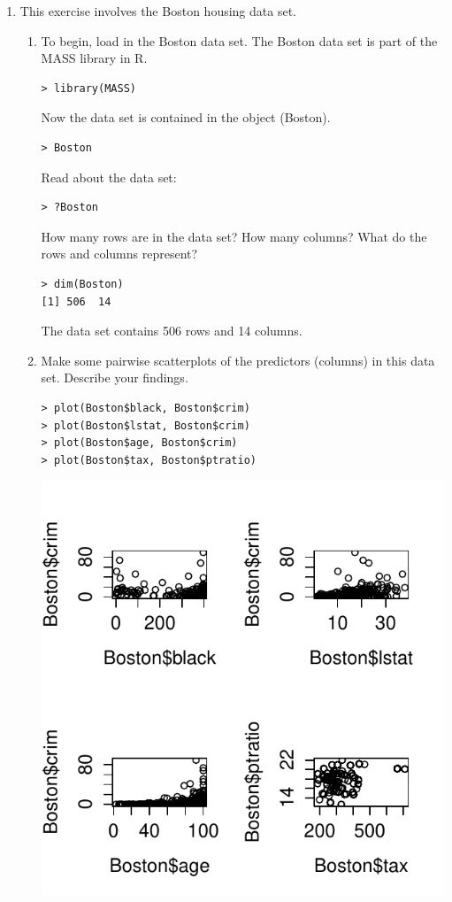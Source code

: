 \documentclass[11pt]{article}
\providecommand{\code}[1]{{\color{red}\ttfamily #1}}
\begin{document}
\begin{enumerate}
\item This exercise involves the \code{Boston} housing data set.
\begin{enumerate}
\item To begin, load in the \code{Boston} data set.  The \code{Boston} data set is part of the \code{MASS} library in \code{R}.
\begin{lstlisting}
> library(MASS)
\end{lstlisting}
Now the data set is contained in the object \code(Boston).
\begin{lstlisting}
> Boston
\end{lstlisting}
Read about the data set:
\begin{lstlisting}
> ?Boston
\end{lstlisting}
How many rows are in the data set? How many columns? What do the rows and columns represent?
\begin{lstlisting}
> dim(Boston)
[1] 506  14
\end{lstlisting}
The data set contains 506 rows and 14 columns.
\item Make some pairwise scatterplots of the predictors (columns) in this data set.  Describe your findings.\\
\begin{lstlisting}
> plot(Boston$black, Boston$crim)
> plot(Boston$lstat, Boston$crim)
> plot(Boston$age, Boston$crim)
> plot(Boston$tax, Boston$ptratio)
\end{lstlisting}
\begin{center}
\includegraphics{plot9.pdf}
\end{center}


\end{enumerate}
\end{enumerate}
\end{document}
